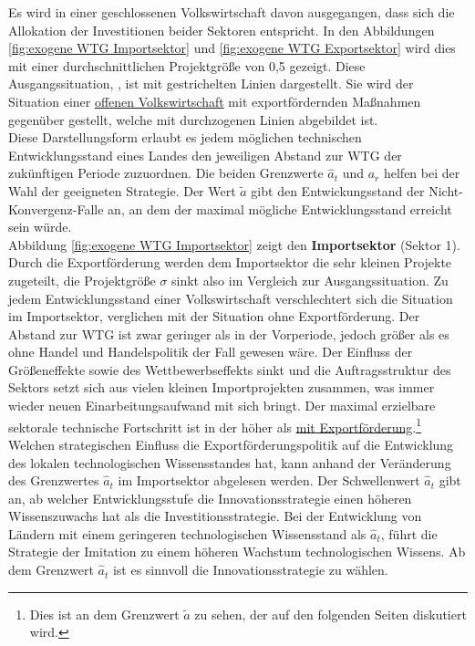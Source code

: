 Es wird in einer geschlossenen Volkswirtschaft davon ausgegangen, dass sich die Allokation der Investitionen beider Sektoren entspricht. In den Abbildungen \ref{fig:exogene WTG Importsektor} und \ref{fig:exogene WTG Exportsektor}  wird dies mit einer durchschnittlichen Projektgröße von 0,5 gezeigt. Diese Ausgangssituation, , ist mit gestrichelten Linien dargestellt. Sie wird der Situation einer \uline{offenen Volkswirtschaft} mit exportfördernden Maßnahmen gegenüber gestellt, welche mit durchzogenen Linien abgebildet ist. \\


Diese Darstellungsform erlaubt es jedem möglichen technischen Entwicklungsstand eines Landes den jeweiligen Abstand zur WTG der zukünftigen Periode zuzuordnen. Die beiden Grenzwerte $\hat{a}_t$ und $a_r$ helfen bei der Wahl der geeigneten Strategie. Der Wert $\tilde{a}$ gibt den Entwickungsstand der Nicht-Konvergenz-Falle an, an dem der maximal mögliche Entwicklungsstand erreicht sein würde. \\


Abbildung \ref{fig:exogene WTG Importsektor} zeigt den \textbf{Importsektor} (Sektor 1). Durch die Exportförderung werden dem Importsektor die sehr kleinen Projekte zugeteilt, die Projektgröße $\sigma$ sinkt also im Vergleich zur Ausgangssituation. Zu jedem Entwicklungsstand einer Volkswirtschaft verschlechtert sich die Situation im Importsektor, verglichen mit der Situation ohne Exportförderung. Der Abstand zur WTG ist zwar geringer als in der Vorperiode, jedoch größer als es ohne Handel und Handelspolitik der Fall gewesen wäre. Der Einfluss der Größeneffekte sowie des Wettbewerbseffekts sinkt und die Auftragsstruktur des Sektors setzt sich aus vielen kleinen Importprojekten zusammen, was immer wieder neuen Einarbeitungsaufwand mit sich bringt. Der maximal erzielbare sektorale technische Fortschritt ist in der  höher als \uline{mit Exportförderung}.\footnote{Dies ist an dem Grenzwert $\tilde{a}$ zu sehen, der auf den folgenden Seiten diskutiert wird.}\\
Welchen strategischen Einfluss die Exportförderungspolitik auf die Entwicklung des lokalen technologischen Wissensstandes  hat, kann anhand der Veränderung des Grenzwertes $\hat{a}_t$ im Importsektor abgelesen werden. Der Schwellenwert $\hat{a}_t$ gibt an, ab welcher Entwicklungsstufe die Innovationsstrategie einen höheren Wissenszuwachs hat als die Investitionsstrategie. Bei der Entwicklung von Ländern mit einem geringeren technologischen Wissensstand als $\hat{a}_t$, führt die \textcolor[rgb]{0,0.32,0}{Strategie der Imitation} zu einem höheren Wachstum technologischen Wissens. Ab dem Grenzwert $\hat{a}_t$ ist es sinnvoll die \textcolor[rgb]{0.74,0.97,0.22}{Innovationsstrategie} zu wählen.\\


